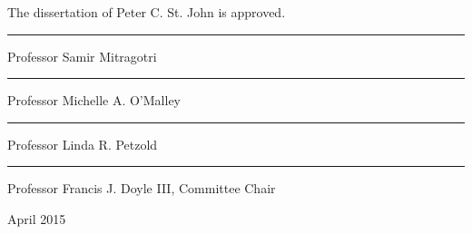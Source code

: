 \thispagestyle{empty}
The dissertation of Peter C. St. John is approved.
\vfil
\begin{minipage}{0.65\textwidth}
  \rule{\textwidth}{0.7pt}
  {\sc Professor Samir Mitragotri}
\end{minipage}
\hfill
\begin{minipage}{0.25\textwidth}
\end{minipage}

\vfil
\begin{minipage}{0.65\textwidth}
  \rule{\textwidth}{0.7pt}
  {\sc Professor Michelle A. O'Malley}
\end{minipage}
\hfill
\begin{minipage}{0.25\textwidth}
\end{minipage}

\vfil
\begin{minipage}{0.65\textwidth}
  \rule{\textwidth}{0.7pt}
  {\sc Professor Linda R. Petzold}
\end{minipage}
\hfill
\begin{minipage}{0.25\textwidth}
\end{minipage}

\vfil
\begin{minipage}{0.65\textwidth}
  \rule{\textwidth}{0.7pt}
  {\sc Professor Francis J. Doyle III, Committee Chair}
\end{minipage}
\hfill
\begin{minipage}{0.25\textwidth}
\end{minipage}

\vfil
\begin{center}
  April 2015
\end{center}

